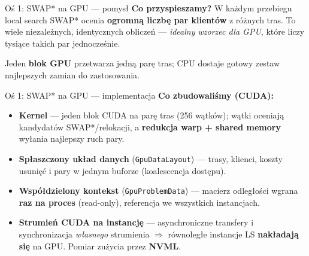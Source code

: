 \documentclass[aspectratio=169,11pt]{beamer}
\begin{document}
\begin{frame}{Oś 1: SWAP* na GPU — pomysł}
  \textbf{Co przyspieszamy?} W każdym przebiegu local search SWAP* ocenia \textbf{ogromną liczbę par klientów} z różnych tras. To wiele niezależnych, identycznych obliczeń — \emph{idealny wzorzec dla GPU}, które liczy tysiące takich par jednocześnie.
  \vfill
  \centering
  \vfill
  {\footnotesize Jeden \textbf{blok GPU} przetwarza jedną parę tras; CPU dostaje gotowy zestaw najlepszych zamian do zastosowania.}
\end{frame}

\begin{frame}[fragile]{Oś 1: SWAP* na GPU — implementacja}
  \textbf{Co zbudowaliśmy (CUDA):}
  {\small
  \begin{itemize}
    \item \textbf{Kernel} — jeden blok CUDA na parę tras (256 wątków); wątki oceniają kandydatów SWAP*/relokacji, a \textbf{redukcja warp + shared memory} wyłania najlepszy ruch pary.
    \item \textbf{Spłaszczony układ danych} (\texttt{GpuDataLayout}) — trasy, klienci, koszty usunięć i pary w jednym buforze (koalescencja dostępu).
    \item \textbf{Współdzielony kontekst} (\texttt{GpuProblemData}) — macierz odległości wgrana \textbf{raz na proces} (read-only), referencja we wszystkich instancjach.
    \item \textbf{Strumień CUDA na instancję} — asynchroniczne transfery i synchronizacja \emph{własnego} strumienia $\Rightarrow$ równoległe instancje LS \textbf{nakładają się} na GPU. Pomiar zużycia przez \textbf{NVML}.
  \end{itemize}}
  \vspace{0.1em}

\end{frame}
\end{document}
